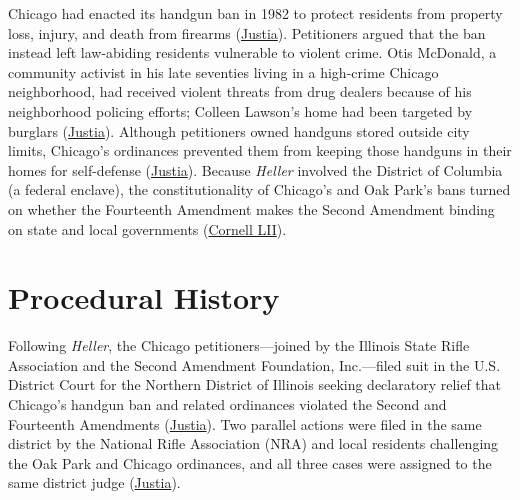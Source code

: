 \documentclass[12pt]{article}
\begin{document}
Chicago had enacted its handgun ban in 1982 to protect residents from property loss, injury, and death from firearms (\href{https://supreme.justia.com/cases/federal/us/561/742/}{Justia}). Petitioners argued that the ban instead left law-abiding residents vulnerable to violent crime. Otis McDonald, a community activist in his late seventies living in a high-crime Chicago neighborhood, had received violent threats from drug dealers because of his neighborhood policing efforts; Colleen Lawson's home had been targeted by burglars (\href{https://supreme.justia.com/cases/federal/us/561/742/}{Justia}). Although petitioners owned handguns stored outside city limits, Chicago's ordinances prevented them from keeping those handguns in their homes for self-defense (\href{https://supreme.justia.com/cases/federal/us/561/742/}{Justia}). Because \textit{Heller} involved the District of Columbia (a federal enclave), the constitutionality of Chicago's and Oak Park's bans turned on whether the Fourteenth Amendment makes the Second Amendment binding on state and local governments (\href{https://www.law.cornell.edu/constitution-conan/amendment-2/post-heller-issues-and-application-of-second-amendment-to-states}{Cornell LII}).

\section{Procedural History}

Following \textit{Heller}, the Chicago petitioners---joined by the Illinois State Rifle Association and the Second Amendment Foundation, Inc.---filed suit in the U.S. District Court for the Northern District of Illinois seeking declaratory relief that Chicago's handgun ban and related ordinances violated the Second and Fourteenth Amendments (\href{https://supreme.justia.com/cases/federal/us/561/742/}{Justia}). Two parallel actions were filed in the same district by the National Rifle Association (NRA) and local residents challenging the Oak Park and Chicago ordinances, and all three cases were assigned to the same district judge (\href{https://supreme.justia.com/cases/federal/us/561/742/}{Justia}).
\end{document}
